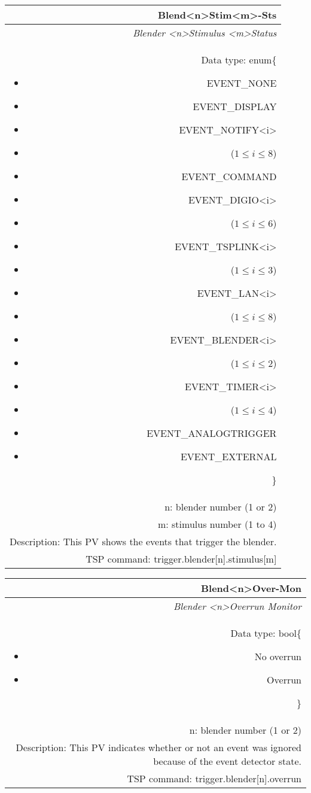 \documentclass[openany]{article}
\begin{document}
		\begin{tabular}{N}
			\hline
			\bfseries Blend{\textless n\textgreater}Stim{\textless m\textgreater}-Sts\label{pv:blendstim-sts} \\ \hline
			\emph{Blender \textless n\textgreater Stimulus \textless m\textgreater Status} \\
			Data type: enum\{\begin{itemize}[noitemsep]
				\small
				\item[] EVENT\_NONE
				\item[] EVENT\_DISPLAY
				\item[] EVENT\_NOTIFY\textless i\textgreater
				\item[] ($1\leq i\leq 8$)
				\item[] EVENT\_COMMAND
				\item[] EVENT\_DIGIO\textless i\textgreater
				\item[] ($1\leq i\leq 6$)
				\item[] EVENT\_TSPLINK\textless i\textgreater
				\item[] ($1\leq i\leq 3$)
				\item[] EVENT\_LAN\textless i\textgreater
				\item[] ($1\leq i\leq 8$)
				\item[] EVENT\_BLENDER\textless i\textgreater 
				\item[] ($1\leq i\leq 2$)
				\item[] EVENT\_TIMER\textless i\textgreater
				\item[] ($1\leq i\leq 4$)
				\item[] EVENT\_ANALOGTRIGGER
				\item[] EVENT\_EXTERNAL
			\end{itemize}\} \\
			n: blender number (1 or 2) \\
			m: stimulus number (1 to 4) \\
			Description: This PV shows the events that trigger the blender. \\
			TSP command: trigger.blender[n].stimulus[m]
		\end{tabular}

		\begin{tabular}{N}
			\hline
			\bfseries Blend{\textless n\textgreater}Over-Mon\label{pv:blendover-mon} \\ \hline
			\emph{Blender \textless n\textgreater Overrun Monitor} \\
			Data type: bool\{\begin{itemize}[noitemsep]
				\small
				\item[] No overrun
				\item[] Overrun
			\end{itemize}\} \\
			n: blender number (1 or 2) \\
			Description: This PV indicates whether or not an event was ignored because of the event detector state. \\
			TSP command: trigger.blender[n].overrun
		\end{tabular}
\end{document}
